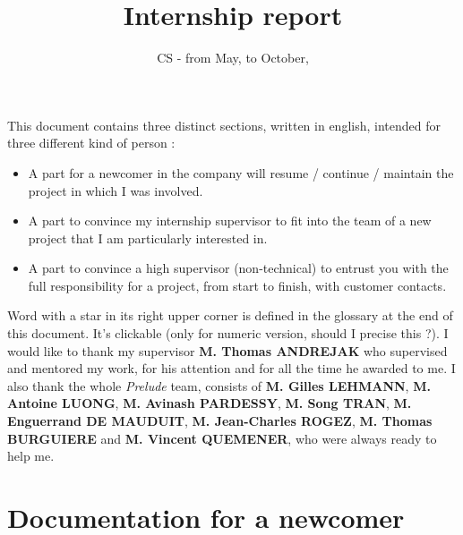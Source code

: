 \documentclass{koala-en}
\begin{document}
\title{Internship report}
\subtitle{CS - from  May,  to October, }


\summary
{
  This document contains three distinct sections, written in english, intended for three different kind of person :
  \begin{itemize}
     \item A part for a newcomer in the company will resume / continue / maintain the project in which I was involved.
     \item A part to convince my internship supervisor to fit into the team of a new project that I am particularly interested in.
     \item A part to convince a high supervisor (non-technical) to entrust you with the full responsibility for a project, from start to finish, with customer contacts.
  \end{itemize}
  Word with a star in its right upper corner is defined in the glossary at the end of this document. It's clickable (only for numeric version, should I precise this ?).
  \newline
  \newline
  \newline
  \newline
  I would like to thank my supervisor \textbf{M. Thomas ANDREJAK} who supervised and mentored my work, for his attention and for all the time he awarded to me.
  \newline
  \newline
  I also thank the whole \emph{Prelude} team, consists of \textbf{M. Gilles LEHMANN}, \textbf{M. Antoine LUONG}, \textbf{M. Avinash PARDESSY}, \textbf{M. Song TRAN}, \textbf{M. Enguerrand DE MAUDUIT}, \textbf{M. Jean-Charles ROGEZ}, \textbf{M. Thomas BURGUIERE} and \textbf{M. Vincent QUEMENER}, who were always ready to help me.
}

\maketitle

\newpage
\thispagestyle{empty}

\tableofcontents

\clearpage
\thispagestyle{empty}
\newpage

\part{Documentation for a newcomer}
\end{document}

